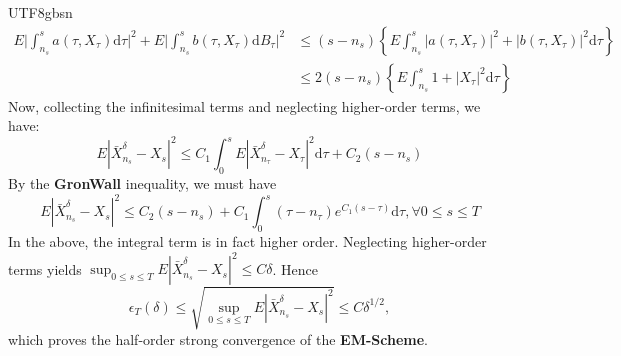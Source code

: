 \documentclass{article}
\begin{document}
\begin{CJK*}{UTF8}{gbsn}
$$\begin{aligned}
E\Bigg|\int_{n_{s}}^{s}a(\tau,X_{\tau})\mathrm{d}\tau\Bigg|^{2} +E\Bigg|\int_{n_{s}}^{s}b(\tau,X_{\tau})\mathrm{d}B_{\tau}\Bigg|^{2}
&\le(s-n_s)\left\{
E\int_{n_{s}}^{s}\left|a(\tau,X_{\tau})\right|^2+\left|b(\tau,X_{\tau})\right|^2\mathrm{d}\tau\right\}\\
&\le2(s-n_s)\left\{
E\int_{n_{s}}^{s}1+\left|X_{\tau}\right|^2\mathrm{d}\tau\right\}
\end{aligned}$$
Now, collecting the infinitesimal terms and neglecting higher-order terms, we have:
$$
E\left|\bar{X}_{n_{s}}^{\delta}-X_{s}\right|^{2}
\le
C_1\int_0^sE\left|\bar{X}_{n_\tau}^{\delta}-X_{\tau}\right|^2\mathrm{d}\tau
+C_2(s-n_s)
$$
By the \textbf{GronWall} inequality, we must have
$$
E\left|\bar{X}_{n_{s}}^{\delta}-X_{s}\right|^{2}
\le
C_2(s-n_s)
+
C_1\int_0^s
(\tau-n_\tau)e^{C_1(s-\tau)}
\mathrm{d}\tau
,\forall 0\le s\le T
$$
In the above, the integral term is in fact higher order. Neglecting higher-order terms yields
$\sup_{0\le s\le T} E\left|\bar{X}_{n_{s}}^{\delta}-X_{s}\right|^{2}\le C\delta$. Hence
$$
\epsilon_{T}(\delta)
\le
\sqrt{\sup_{0\le s\le T} E\left|\bar{X}_{n_{s}}^{\delta}-X_{s}\right|^{2}}\le C\delta^{1/2},
$$
which proves the half-order strong convergence of the \textbf{EM-Scheme}.


\end{CJK*}
\end{document}
